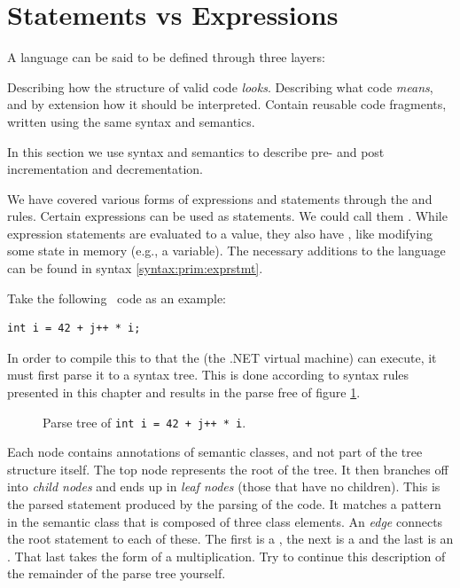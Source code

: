 \section{Statements vs Expressions}
\label{sec:primitive:stmtVSexpr}

A language can be said to be defined through three layers:
\begin{enumerate}
     Describing how the structure of valid code \textsl{looks}.
     Describing what code \textsl{means}, and by extension how it should be interpreted.
     Contain reusable code fragments, written using the same syntax and semantics.
\end{enumerate}
In this section we use syntax and semantics to describe pre- and post incrementation and decrementation.

We have covered various forms of expressions and statements through the  and  rules. Certain expressions can be used as statements. We could call them . While expression statements are evaluated to a value, they also have , like modifying some state in memory (e.g., a variable). The necessary additions to the language can be found in syntax \ref{syntax:prim:exprstmt}.

\begin{syntaxfloat}
  
  \caption{Expression statements.}
  \label{syntax:prim:exprstmt}
\end{syntaxfloat}

Take the following \csharp\ code as an example:
\begin{verbatim}
int i = 42 + j++ * i;
\end{verbatim}

In order to compile this to  that the  (the .NET virtual machine) can execute, it must first parse it to a syntax tree. This is done according to syntax rules presented in this chapter and results in the parse free of figure \ref{fig:prim:stmtVSexpr}.

\begin{figure}[tbp]
  
  \caption{Parse tree of \texttt{int i = 42 + j++ * i}.}
  \label{fig:prim:stmtVSexpr}
\end{figure}

Each node contains annotations of semantic classes, and not part of the tree structure itself. The top node represents the root of the tree. It then branches off into \textsl{child nodes} and ends up in \textsl{leaf nodes} (those that have no children). This is the parsed statement produced by the parsing of the code. It matches a pattern in the semantic class  that is composed of three class elements. An \textsl{edge} connects the root statement to each of these. The first is a , the next is a  and the last is an . That last  takes the form of a multiplication. Try to continue this description of the remainder of the parse tree yourself.

